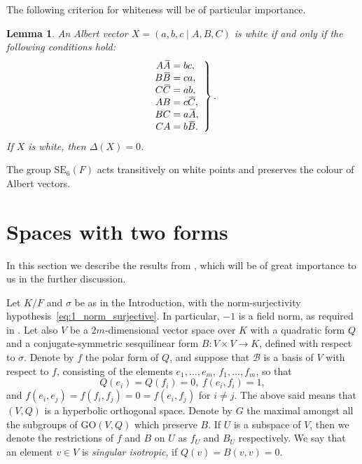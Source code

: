 \documentclass{amsart}
\def\ovA{\mathord{\mbox{\hspace*{0pt}}\,\overline{\!A\!\!\;}\!\:}\mbox{\hspace*{0pt}}}
\def\ovB{\mathord{\mbox{\hspace*{0pt}}\,\overline{\!B\!\!\;}\!\:}\mbox{\hspace*{0pt}}}
\def\ovC{\mathord{\mbox{\hspace*{0pt}}\,\overline{\!C\!\!\;}\!\:}\mbox{\hspace*{0pt}}}
\newcommand{\GO}{\mathrm{GO}}
\newcommand{\SE}{\mathrm{SE}}
\newcommand{\s}{\sigma}
\newcommand{\fdet}{\Delta}
\theoremstyle{plain}
\numberwithin{theorem}{section}
\newtheorem{lemma}[theorem]{Lemma}
\theoremstyle{definition}
\begin{document}
The following criterion for whiteness will be of particular importance.

\begin{lemma}
	\label{lemma:2_whiteness}
	An Albert vector $X = (a,b,c\mid A,B,C)$ is white if and only if the following
	conditions hold:
	\begin{equation}
		\label{eq:2_whiteness}
		\left.\begin{array}{r@{\;}c@{\;}l}
			A \ovA & = & bc, \\
			B \ovB & = & ca, \\
			C \ovC & = & ab, \\
			AB & = & c\ovC, \\
			BC & = & a\ovA, \\
			CA & = & b\ovB.
		\end{array}
		\right\}.
	\end{equation}
	If $X$ is white, then $\fdet(X) = 0$.
\end{lemma}

The group $\SE_6(F)$ acts transitively on white points and preserves the colour of
Albert vectors.

\section{Spaces with two forms}

In this section we describe the results from \cite[Section 10]{Asch1}, which will be of great importance to us in
the further discussion.

Let $K/F$ and $\s$ be as in the Introduction, with the norm-surjectivity
hypothesis~\eqref{eq:1_norm_surjective}. In particular, $-1$ is a field norm,
as required in \cite[Section~10]{Asch1}.
Let also $V$ be a $2m$-dimensional vector space over $K$ with a quadratic form $Q$ and a conjugate-symmetric
sesquilinear form \mbox{$B : V\times V \rightarrow K$}, defined with respect to $\s$. Denote by $f$ the polar
form of $Q$, and suppose that  \mbox{$\mathcal{B}$} is a basis of $V$ with respect to $f$, consisting of the
elements $e_1, \ldots, e_m$, $f_1,\ldots,f_m$, so that
\begin{equation}
	Q(e_i) = Q(f_i) = 0,\ f(e_i, f_i) = 1,
\end{equation}
and $f(e_i,e_j) = f(f_i,f_j) = 0 = f(e_i,f_j)$ for $i \neq j$. The above said means that $(V,Q)$ is a hyperbolic
orthogonal space. Denote by $G$ the maximal amongst all the subgroups of $\GO(V, Q)$ which preserve $B$. If $U$
is a subspace of $V$, then we denote the restrictions of $f$ and $B$ on $U$ as $f_U$ and $B_U$ respectively. We 
say that an element $v \in V$ is \textit{singular isotropic}, if $Q(v) = B(v,v) = 0$. 
\end{document}
